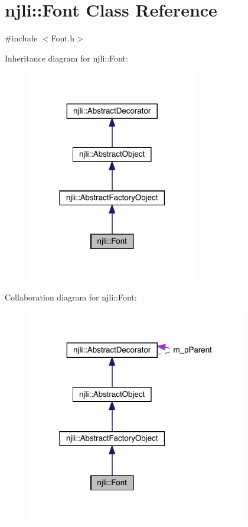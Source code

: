 \hypertarget{classnjli_1_1_font}{}\section{njli\+:\+:Font Class Reference}
\label{classnjli_1_1_font}


{\ttfamily \#include $<$Font.\+h$>$}



Inheritance diagram for njli\+:\+:Font\+:\nopagebreak
\begin{figure}[H]
\begin{center}
\leavevmode
\includegraphics[width=213pt]{classnjli_1_1_font__inherit__graph}
\end{center}
\end{figure}


Collaboration diagram for njli\+:\+:Font\+:\nopagebreak
\begin{figure}[H]
\begin{center}
\leavevmode
\includegraphics[width=273pt]{classnjli_1_1_font__coll__graph}
\end{center}
\end{figure}

